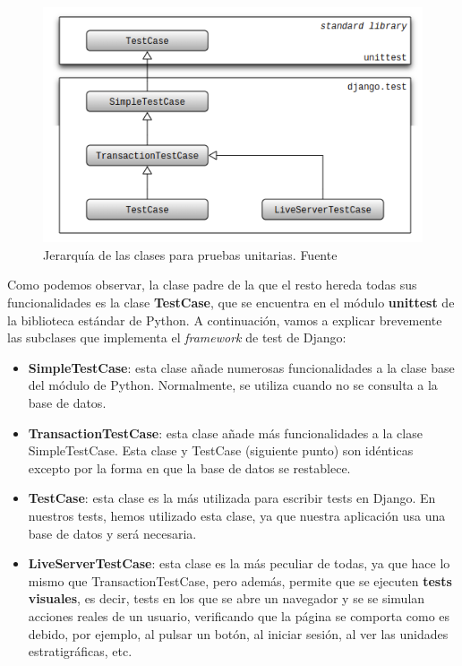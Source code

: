    \begin{figure}[H]
        \centering
        \includegraphics[scale=0.60]{imagenes/classes-hierarchy.png}
        \caption[Jerarquía de las clases para pruebas unitarias.]{Jerarquía de las
        clases para pruebas unitarias. Fuente \cite{classes-hierarchy}}
        \label{fig:classes-hierarchy}
    \end{figure}

Como podemos observar, la clase padre de la que el resto hereda todas sus funcionalidades
es la clase \textbf{TestCase}, que se encuentra en el módulo \textbf{unittest} de la
biblioteca estándar de Python. A continuación, vamos a explicar brevemente las subclases
que implementa el \textit{framework} de test de Django:

    \begin{itemize}
        \item \textbf{SimpleTestCase}: esta clase añade numerosas funcionalidades a la
        clase base del módulo de Python. Normalmente, se utiliza cuando no se consulta a
        la base de datos.
        \item \textbf{TransactionTestCase}: esta clase añade más funcionalidades a la
        clase SimpleTestCase. Esta clase y TestCase (siguiente punto) son idénticas
        excepto por la forma en que la base de datos se restablece.
        \item \textbf{TestCase}: esta clase es la más utilizada para escribir tests en
        Django. En nuestros tests, hemos utilizado esta clase, ya que nuestra aplicación
        usa una base de datos y será necesaria.
        \item \textbf{LiveServerTestCase}: esta clase es la más peculiar de todas, ya que
        hace lo mismo que TransactionTestCase, pero además, permite que se ejecuten
        \textbf{tests visuales}, es decir, tests en los que se abre un navegador y se
        se simulan acciones reales de un usuario, verificando que la página se comporta
        como es debido, por ejemplo, al pulsar un botón, al iniciar sesión, al ver las
        unidades estratigráficas, etc.
    \end{itemize}

